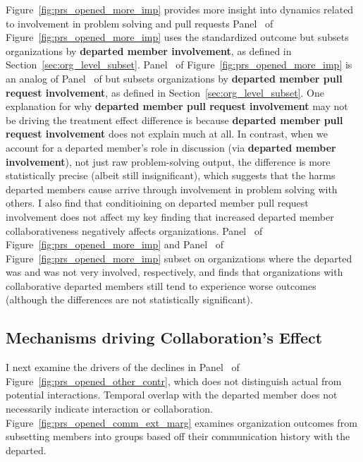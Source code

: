 \documentclass[12pt,notitlepage]{article}
\begin{document}
Figure~\ref{fig:prs_opened_more_imp} provides more insight into dynamics related to involvement in problem solving and pull requests Panel~ of Figure~\ref{fig:prs_opened_more_imp} uses the standardized outcome but subsets organizations by \textbf{departed member involvement}, as defined in Section~\ref{sec:org_level_subset}. Panel~ of Figure~\ref{fig:prs_opened_more_imp} is an analog of Panel~ of but subsets organizations by \textbf{departed member pull request involvement}, as defined in Section~\ref{sec:org_level_subset}. One explanation for why \textbf{departed member pull request involvement} may not be driving the treatment effect difference is because \textbf{departed member pull request involvement} does not explain much at all. In contrast, when we account for a departed member's role in discussion (via \textbf{departed member involvement}), not just raw problem-solving output, the difference is more statistically precise (albeit still insignificant), which suggests that the harms departed members cause arrive through involvement in problem solving with others. I also find that conditioining on departed member pull request involvement does not affect my key finding that increased departed member collaborativeness negatively affects organizations. Panel~ of Figure~\ref{fig:prs_opened_more_imp} and Panel~ of Figure~\ref{fig:prs_opened_more_imp} subset on organizations where the departed was and was not very involved, respectively, and finds that organizations with collaborative departed members still tend to experience worse outcomes (although the differences are not statistically significant).

\subsection{Mechanisms driving Collaboration's Effect}

I next examine the drivers of the declines in Panel~ of Figure~\ref{fig:prs_opened_other_contr}, which does not distinguish actual from potential interactions. Temporal overlap with the departed member does not necessarily indicate interaction or collaboration. Figure~\ref{fig:prs_opened_comm_ext_marg} examines  organization outcomes from subsetting members into groups based off their communication history with the departed. 
\end{document}
